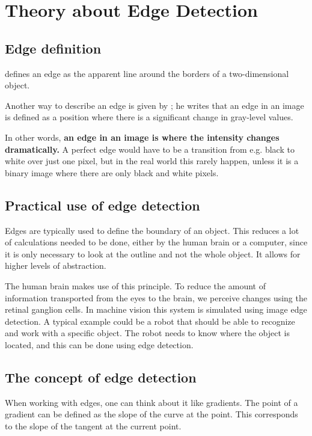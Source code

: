 \chapter{Theory about Edge Detection}
\section{Edge definition}
\citep{visual_story} defines an edge as the apparent line around the borders of a two-dimensional object.

Another way to describe an edge is given by \citep{ip_book}; he writes that an edge in an image is defined as a position where there is a significant change in gray-level values.

In other words, \textbf{an edge in an image is where the intensity changes dramatically.} A perfect edge would have to be a transition from e.g. black to white over just one pixel, but in the real world this rarely happen, unless it is a binary image where there are only black and white pixels.

\section{Practical use of edge detection}
Edges are typically used to define the boundary of an object. This reduces a lot of calculations needed to be done, either by the human brain or a computer, since it is only necessary to look at the outline and not the whole object. It allows for higher levels of abstraction.

The human brain makes use of this principle. To reduce the amount of information transported from the eyes to the brain, we perceive changes using the retinal ganglion cells. \citep{perception} In machine vision this system is simulated using image edge detection. A typical example could be a robot that should be able to recognize and work with a specific object. The robot needs to know where the object is located, and this can be done using edge detection.

\section{The concept of edge detection}
\label{concept_edge_detection}
When working with edges, one can think about it like gradients. The point of a gradient can be defined as the slope of the curve at the point. This corresponds to the slope of the tangent at the current point. \citep{ip_book} 

